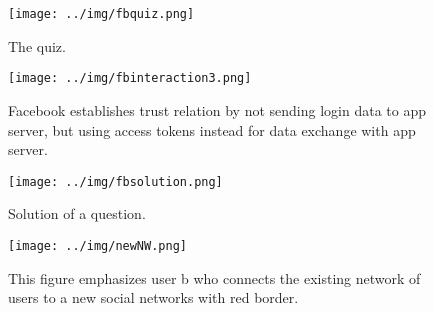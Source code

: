 \documentclass[preprint,12pt]{elsarticle}
\begin{document}













\newpage
\appendix

\begin{figure}
  \texttt{[image: ../img/fbquiz.png]}
 \caption{The quiz.}
\label{fig:quiz}
\end{figure}

\begin{figure}
\label{fig:authorization}
  \texttt{[image: ../img/fbinteraction3.png]}
  \caption{Facebook establishes trust relation by not sending login
    data to app server, but using access tokens instead for
    data exchange with app server.}
\end{figure}


\begin{figure}
  \texttt{[image: ../img/fbsolution.png]}
  \caption{Solution of a question.}
\label{fig:solution}
\end{figure}

\begin{figure}
  \texttt{[image: ../img/newNW.png]}
 \caption{This figure emphasizes user b who connects the existing
   network of users to a new social networks with
   red border.}
\label{fig:newNW}
\end{figure}
\end{document}
